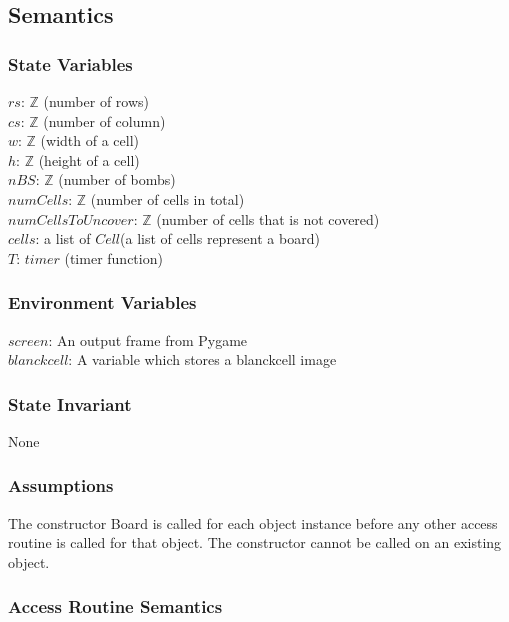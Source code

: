 \documentclass[12pt]{article}
\begin{document}
\subsection {Semantics}

\subsubsection {State Variables}

$rs$: $\mathbb{Z}$ (number of rows)\\
$cs$: $\mathbb{Z}$ (number of column)\\
$w$: $\mathbb{Z}$ (width of a cell)\\
$h$: $\mathbb{Z}$ (height of a cell)\\
$nBS$: $\mathbb{Z}$ (number of bombs)\\
$numCells$: $\mathbb{Z}$ (number of cells in total)\\
$numCellsToUncover$: $\mathbb{Z}$ (number of cells that is not covered)\\
$cells$: a list of $Cell$(a list of cells represent a board)\\
$T$: $timer$ (timer function)

\subsubsection {Environment Variables}

$screen$: An output frame from Pygame\\
$blanckcell$: A variable which stores a blanckcell image

\subsubsection {State Invariant}

None

\subsubsection {Assumptions}

The constructor Board is called for each object instance before any other
access routine is called for that object.  The constructor cannot be called on
an existing object.

\subsubsection {Access Routine Semantics}
\end{document}
